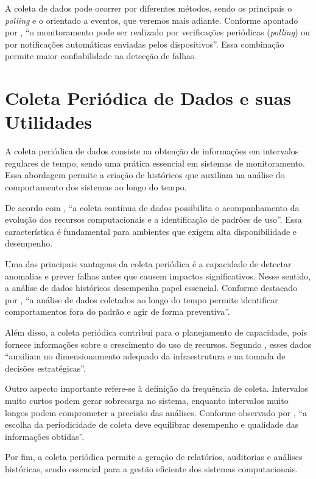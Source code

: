 \documentclass[
    12pt
    ,oneside
    ,a4paper
    ,chapter=TITLE
    ,section=TITLE
    ,sumario=abnt-6027-2012]{abntex2}
\begin{document}
A coleta de dados pode ocorrer por diferentes métodos, sendo os principais o \textit{polling} e o orientado a eventos, que veremos mais adiante. Conforme apontado por , “o monitoramento pode ser realizado por verificações periódicas (\textit{polling}) ou por notificações automáticas enviadas pelos dispositivos”. Essa combinação permite maior confiabilidade na detecção de falhas.

\section{Coleta Periódica de Dados e suas Utilidades}

A coleta periódica de dados consiste na obtenção de informações em intervalos regulares de tempo, sendo uma prática essencial em sistemas de monitoramento. Essa abordagem permite a criação de históricos que auxiliam na análise do comportamento dos sistemas ao longo do tempo.

De acordo com , “a coleta contínua de dados possibilita o acompanhamento da evolução dos recursos computacionais e a identificação de padrões de uso”. Essa característica é fundamental para ambientes que exigem alta disponibilidade e desempenho.

Uma das principais vantagens da coleta periódica é a capacidade de detectar anomalias e prever falhas antes que causem impactos significativos. Nesse sentido, a análise de dados históricos desempenha papel essencial. Conforme destacado por , “a análise de dados coletados ao longo do tempo permite identificar comportamentos fora do padrão e agir de forma preventiva”.

Além disso, a coleta periódica contribui para o planejamento de capacidade, pois fornece informações sobre o crescimento do uso de recursos. Segundo , esses dados “auxiliam no dimensionamento adequado da infraestrutura e na tomada de decisões estratégicas”.

Outro aspecto importante refere-se à definição da frequência de coleta. Intervalos muito curtos podem gerar sobrecarga no sistema, enquanto intervalos muito longos podem comprometer a precisão das análises. Conforme observado por , “a escolha da periodicidade de coleta deve equilibrar desempenho e qualidade das informações obtidas”.

Por fim, a coleta periódica permite a geração de relatórios, auditorias e análises históricas, sendo essencial para a gestão eficiente dos sistemas computacionais.
\end{document}
